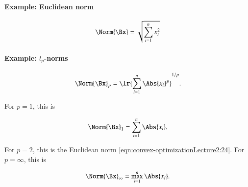 
\paragraph{Example: Euclidean norm}

\begin{dmath}\label{eqn:convex-optimizationLecture2:24}
\Norm{\Bx} = \sqrt{ \sum_{i = 1}^n x_i^2 }
\end{dmath}

\paragraph{Example: \(l_p\)-norms}

\begin{dmath}\label{eqn:convex-optimizationLecture2:44}
\Norm{\Bx}_p = \lr{ \sum_{i = 1}^n \Abs{x_i}^p }^{1/p}.
\end{dmath}

For \( p = 1 \), this is

\begin{dmath}\label{eqn:convex-optimizationLecture2:64}
\Norm{\Bx}_1 = \sum_{i = 1}^n \Abs{x_i},
\end{dmath}

For \( p = 2 \), this is the Euclidean norm \cref{eqn:convex-optimizationLecture2:24}.
For \( p = \infty \), this is

\begin{dmath}\label{eqn:convex-optimizationLecture2:324}
\Norm{\Bx}_\infty = \max_{i = 1}^n \Abs{x_i}.
\end{dmath}

